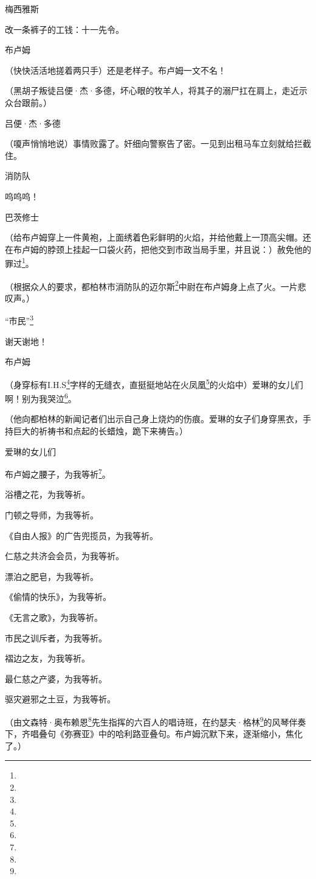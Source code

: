 \par 梅西雅斯
\par 改一条裤子的工钱：十一先令。
\par 布卢姆
\par （快快活活地搓着两只手）还是老样子。布卢姆一文不名！
\par （黑胡子叛徒吕便·杰·多德，坏心眼的牧羊人，将其子的溺尸扛在肩上，走近示众台跟前。）
\par 吕便·杰·多德
\par （嗄声悄悄地说）事情败露了。奸细向警察告了密。一见到出租马车立刻就给拦截住。
\par 消防队
\par 呜呜呜！
\par 巴茨修士
\par （给布卢姆穿上一件黄袍，上面绣着色彩鲜明的火焰，并给他戴上一顶高尖帽。还在布卢姆的脖颈上挂起一口袋火药，把他交到市政当局手里，并且说：）赦免他的罪过\footnote{}。
\par （根据众人的要求，都柏林市消防队的迈尔斯\footnote{}中尉在布卢姆身上点了火。一片悲叹声。）
\par “市民”\footnote{}
\par 谢天谢地！
\par 布卢姆
\par （身穿标有I.H.S\footnote{}字样的无缝衣，直挺挺地站在火凤凰\footnote{}的火焰中）爱琳的女儿们啊！别为我哭泣\footnote{}。
\par （他向都柏林的新闻记者们出示自己身上烧灼的伤痕。爱琳的女子们身穿黑衣，手持巨大的祈祷书和点起的长蜡烛，跪下来祷告。）
\par 爱琳的女儿们
\par 布卢姆之腰子，为我等祈\footnote{}。
\par 浴槽之花，为我等祈。
\par 门顿之导师，为我等祈。
\par 《自由人报》的广告兜揽员，为我等祈。
\par 仁慈之共济会会员，为我等祈。
\par 漂泊之肥皂，为我等祈。
\par 《偷情的快乐》，为我等祈。
\par 《无言之歌》，为我等祈。
\par 市民之训斥者，为我等祈。
\par 褶边之友，为我等祈。
\par 最仁慈之产婆，为我等祈。
\par 驱灾避邪之土豆，为我等祈。
\par （由文森特·奥布赖恩\footnote{}先生指挥的六百人的唱诗班，在约瑟夫·格林\footnote{}的风琴伴奏下，齐唱叠句《弥赛亚》中的哈利路亚叠句。布卢姆沉默下来，逐渐缩小，焦化了。）
